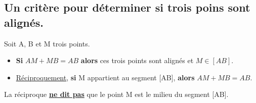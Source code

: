 \documentclass[a4paper]{book}
\begin{document}
\subsection{Un critère pour déterminer si trois poins sont alignés.}
    \begin{propriete}
        Soit A, B et M trois points.

        \begin{itemize}
            \item \textbf{Si} $AM+MB=AB$ \textbf{alors} ces trois points sont alignés et $M \in [AB]$.

            \item \underline{Réciproquement}, \textbf{si} M appartient au segment [AB], \textbf{alors} $AM+MB=AB$.
        \end{itemize}
    \end{propriete}


    \begin{remarque}
        La réciproque \underline{\textbf{ne dit pas}} que le point M est le milieu du segment [AB].
    \end{remarque}
\end{document}
